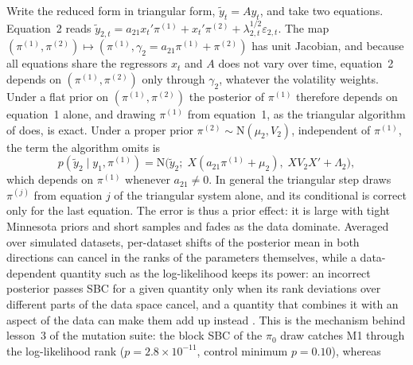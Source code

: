 Write the reduced form in triangular form, $\tilde y_t = Ay_t$, and take two equations.
Equation~2 reads $\tilde y_{2,t} = a_{21}x_t'\pi^{(1)} + x_t'\pi^{(2)} +
\lambda_{2,t}^{1/2}\varepsilon_{2,t}$.
The map $(\pi^{(1)}, \pi^{(2)}) \mapsto (\pi^{(1)}, \gamma_2 = a_{21}\pi^{(1)} + \pi^{(2)})$ has unit
Jacobian, and because all equations share the regressors $x_t$ and $A$ does not vary over time,
equation~2 depends on $(\pi^{(1)}, \pi^{(2)})$ only through $\gamma_2$, whatever the volatility
weights.
Under a flat prior on $(\pi^{(1)}, \pi^{(2)})$ the posterior of $\pi^{(1)}$ therefore depends on
equation~1 alone, and drawing $\pi^{(1)}$ from equation~1, as the triangular algorithm of
\citet{carriero2019large} does, is exact.
Under a proper prior $\pi^{(2)} \sim \mathrm{N}(\mu_2, V_2)$, independent of $\pi^{(1)}$, the term the
algorithm omits is
\begin{equation}\label{eq:ccm-missing}
p(\tilde y_2 \mid y_1, \pi^{(1)}) = \mathrm{N}\big(\tilde y_2;\; X(a_{21}\pi^{(1)} + \mu_2),\;
XV_2X' + \Lambda_2\big),
\end{equation}
which depends on $\pi^{(1)}$ whenever $a_{21} \ne 0$.
In general the triangular step draws $\pi^{(j)}$ from equation $j$ of the triangular system alone,
and its conditional is correct only for the last equation. %
The error is thus a prior effect: it is large with tight Minnesota priors and short samples and
fades as the data dominate.
Averaged over simulated datasets, per-dataset shifts of the posterior mean in both directions can
cancel in the ranks of the parameters themselves, while a data-dependent quantity such as the
log-likelihood keeps its power: an incorrect posterior passes SBC for a given quantity only when its
rank deviations over different parts of the data space cancel, and a quantity that combines it with an
aspect of the data can make them add up instead \citep[Sections~3.2--3.3, Theorem~5]{modrak2025simulation}.
This is the mechanism behind lesson~3 of the mutation suite: the block SBC of the $\pi_0$ draw catches
M1 through the log-likelihood rank ($p = 2.8\times10^{-11}$, control minimum $p = 0.10$), whereas
